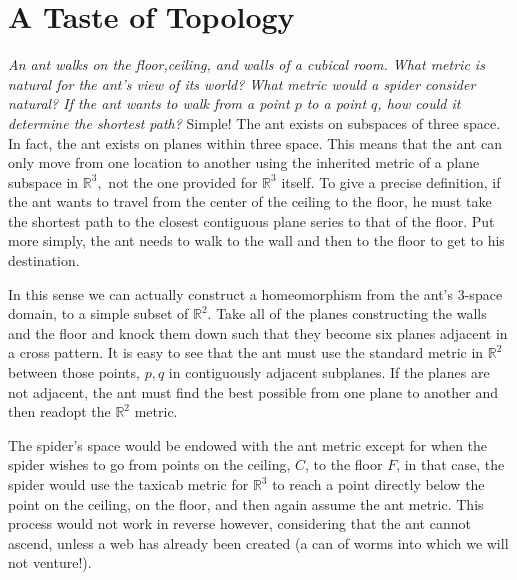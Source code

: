 \documentclass[letter]{article}
\newenvironment{menumerate}{%
  \edef\backupindent{\the\parindent}%
  \enumerate%
  \setlength{\parindent}{\backupindent}%
}{\endenumerate}
\begin{document}
\section{A Taste of Topology}
\begin{menumerate}
	\item \textit{An ant walks on the floor,ceiling, and walls of a cubical room. What metric is natural for the ant's view of its world? What metric would a spider consider natural? If the ant wants to walk from a point $p$ to a point $q$, how could it determine the shortest path?} Simple! The ant exists on subspaces of three space. In fact, the ant exists on planes within three space. This means that the ant can only move from one location to another using the inherited metric of a plane subspace in $\mathbb{R}^3,$ not the one provided for $\mathbb{R}^3$ itself. To give a precise definition, if the ant wants to travel from the center of the ceiling to the floor, he must take the shortest path to the closest contiguous plane series to that of the floor. Put more simply, the ant needs to walk to the wall and then to the floor to get to his destination.

	 In this sense we can actually construct a homeomorphism from the ant's $3$-space domain, to a simple subset of $\mathbb{R}^2.$ Take all of the planes constructing the walls and the floor and knock them down such that they become six planes adjacent in a cross pattern. It is easy to see that the ant must use the standard metric in $\mathbb{R}^2$ between those points, $p,q$ in contiguously adjacent subplanes. If the planes are not adjacent, the ant must find the best possible from one plane to another and then readopt the $\mathbb{R}^2$ metric.

	 The spider's space would be endowed with the ant metric except for when the spider wishes to go from points on the ceiling, $C$, to the floor $F$, in that case, the spider would use the taxicab metric for $\mathbb{R}^3$ to reach a point directly below the point on the ceiling, on the floor, and then again assume the ant metric. This process would not work in reverse however, considering that the ant cannot ascend, unless a web has already been created (a can of worms into which we will not venture!).

	 \item
\end{menumerate}
\end{document}
